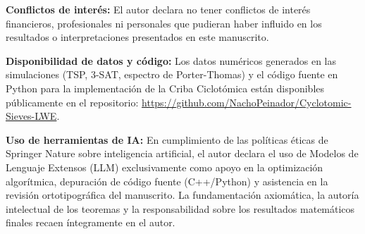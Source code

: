 \documentclass[sn-mathphys]{sn-jnl}
\theoremstyle{definition} %
\begin{document}
\textbf{Conflictos de interés:} El autor declara no tener conflictos de interés financieros, profesionales ni personales que pudieran haber influido en los resultados o interpretaciones presentados en este manuscrito.

\textbf{Disponibilidad de datos y código:} Los datos numéricos generados en las simulaciones (TSP, 3-SAT, espectro de Porter-Thomas) y el código fuente en Python para la implementación de la Criba Ciclotómica están disponibles públicamente en el repositorio: \url{https://github.com/NachoPeinador/Cyclotomic-Sieves-LWE}.

\textbf{Uso de herramientas de IA:} En cumplimiento de las políticas éticas de Springer Nature sobre inteligencia artificial, el autor declara el uso de Modelos de Lenguaje Extensos (LLM) exclusivamente como apoyo en la optimización algorítmica, depuración de código fuente (C++/Python) y asistencia en la revisión ortotipográfica del manuscrito. La fundamentación axiomática, la autoría intelectual de los teoremas y la responsabilidad sobre los resultados matemáticos finales recaen íntegramente en el autor.
\end{document}
